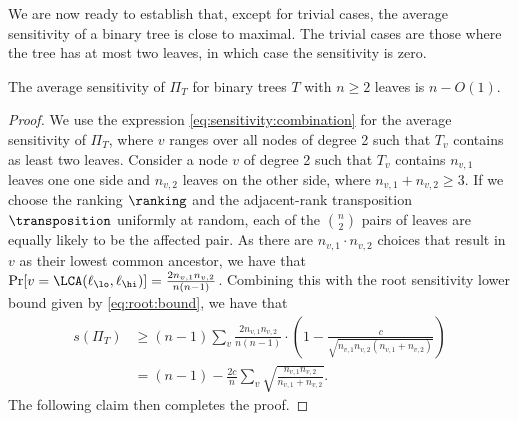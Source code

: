 We are now ready to establish that, except for trivial cases, the average sensitivity of a binary tree is close to maximal. The trivial cases are those where the tree has at most two leaves, in which case the sensitivity is zero. 
\begin{lemma}
\label{lemma:sensitivity:binary}
The average sensitivity of $\Pi_T$ for binary trees $T$ with $n \ge 2$ leaves is $n-O(1)$.
\end{lemma}
\begin{proof}
We use the expression \eqref{eq:sensitivity:combination} for the average sensitivity of $\Pi_T$, where $v$ ranges over all nodes of degree 2 such that $T_v$ contains as least two leaves.
Consider a node $v$ of degree 2 such that $T_v$ contains $n_{v,1}$ leaves one one side and $n_{v,2}$ leaves on the other side, where $n_{v,1}+n_{v,2} \ge 3$. If we choose the ranking $\ranking$ and the adjacent-rank transposition $\transposition$ uniformly at random, each of the $\binom{n}{2}$ pairs of leaves are equally likely to be the affected pair. As there are $n_{v,1} \cdot n_{v,2}$ choices that result in $v$ as their lowest common ancestor, we have that
$\Pr[ v = \LCA(\ell_\lo,\ell_\hi) ] = \frac{2 n_{v,1} n_{v,2}}{n(n-1)}$. Combining this with the root sensitivity lower bound given by \eqref{eq:root:bound}, we have that
\begin{align*} 
s(\Pi_T) & \ge (n-1) \sum_v \frac{2 n_{v,1} n_{v,2}}{n(n-1)} \cdot \left( 1 - \frac{c}{\sqrt{n_{v,1} n_{v,2} (n_{v,1}+n_{v,2})}} \right)  \\
& = (n-1) - \frac{2c}{n} \sum_v \sqrt{\frac{n_{v,1} n_{v,2}}{n_{v,1}+n_{v,2}}}. 
\end{align*}
The following claim then completes the proof.
\end{proof}

